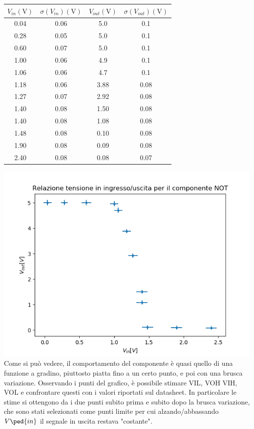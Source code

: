 \documentclass[10pt,a4paper]{article}
\begin{document}
	\begin{center}
\begin{tabular}{|c|c|c|c|}
	\hline 
	$V_{in}(\si{\volt})$ & $\sigma(V_{in}) (\si{\volt})$ & $V_{out} (\si{\volt})$ & $\sigma(V_{out}) (\si{\volt})$ \\ 
	\hline 
	0.04&0.06&5.0&0.1\\ \hline
	0.28&0.05&5.0&0.1\\ \hline
	0.60&0.07&5.0&0.1\\ \hline
	1.00&0.06&4.9&0.1\\ \hline
	1.06&0.06&4.7&0.1\\ \hline
	1.18&0.06&3.88&0.08\\ \hline
	1.27&0.07&2.92&0.08\\ \hline
	1.40&0.08&1.50&0.08\\ \hline
	1.40&0.08&1.08&0.08\\ \hline
	1.48&0.08&0.10&0.08\\ \hline
	1.90&0.08&0.09&0.08\\ \hline
	2.40&0.08&0.08&0.07\\ \hline
\end{tabular} 
	\end{center}
\includegraphics[scale=0.5]{gain.png}\centering
\\Come si può vedere, il comportamento del componente è quasi quello di una funzione a gradino, piuttosto piatta fino a un certo punto, e poi con una brusca variazione.
Osservando i punti del grafico, è possibile  stimare VIL, VOH  VIH, VOL e confrontare questi  con i valori riportati sul datasheet. In particolare le stime si  ottengono da i due punti subito prima e subito dopo la brusca variazione, che sono stati selezionati come punti limite per cui alzando/abbassando $V\ped{in}$ il segnale in uscita restava "costante".
\\
\end{document}
